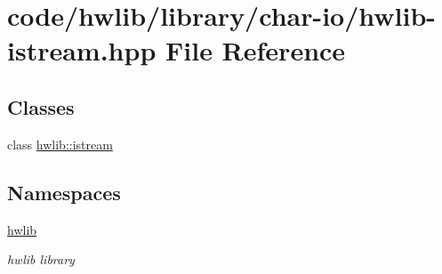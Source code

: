 \hypertarget{hwlib-istream_8hpp}{}\section{code/hwlib/library/char-\/io/hwlib-\/istream.hpp File Reference}
\label{hwlib-istream_8hpp}
\subsection*{Classes}
\begin{DoxyCompactItemize}
\item 
class \hyperlink{classhwlib_1_1istream}{hwlib\+::istream}
\end{DoxyCompactItemize}
\subsection*{Namespaces}
\begin{DoxyCompactItemize}
\item 
 \hyperlink{namespacehwlib}{hwlib}
\begin{DoxyCompactList}\small\item\em hwlib library \end{DoxyCompactList}\end{DoxyCompactItemize}
